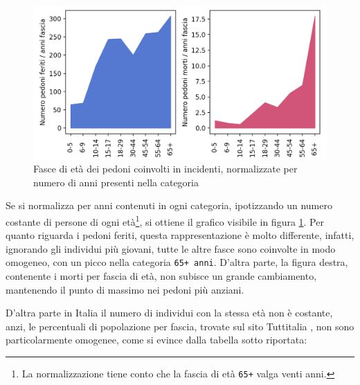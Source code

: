 \documentclass[a4paper,12pt]{report}
\newcommand{\columnstyle}[1]{\texttt{#1}}
\begin{document}
\begin{figure}
    \includegraphics[width=\linewidth]{../src/incidenti/incidenti_senza_coords/pedoni/eta_pedoni.png}
    \caption{Fasce di età dei pedoni coinvolti in incidenti, normalizzate per numero di anni 
    presenti nella categoria}
    \label{fig:eta-pedoni}
\end{figure}

Se si normalizza per anni contenuti in ogni categoria, ipotizzando un numero 
costante di persone di ogni età\footnote{La normalizzazione tiene conto 
che la fascia di età \columnstyle{65+} valga venti anni.}, 
si ottiene il grafico visibile in figura \ref{fig:eta-pedoni}. 
Per quanto riguarda i pedoni feriti, 
questa rappresentazione è molto differente, infatti, 
ignorando gli individui più giovani, tutte le altre fasce sono coinvolte 
in modo omogeneo, con un picco nella categoria \columnstyle{65+ anni}. 
D'altra parte, la figura destra, contenente i morti per fascia di età, 
non subisce un grande cambiamento, mantenendo il punto di massimo nei 
pedoni più anziani. 

D'altra parte in Italia il numero di individui con 
la stessa età non è costante, anzi, le percentuali di popolazione per fascia, 
trovate sul sito Tuttitalia \cite{TUTTITALIA:1}, non sono particolarmente omogenee, 
come si evince dalla tabella sotto riportata: 
\end{document}
